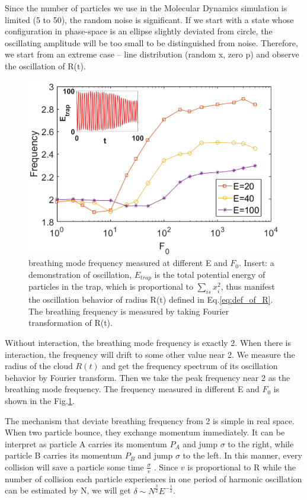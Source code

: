 \documentclass[aps,preprintnumbers,onecolumn,amsmath,amssymb,floatfix,pra]{revtex4-1}
\begin{document}
Since the number of particles we use in the Molecular Dynamics simulation is limited (5 to 50), the
random noise is significant. If we start with a state whose configuration in phase-space is an
ellipse slightly deviated from circle, the oscillating amplitude will be too small to be
distinguished from noise. Therefore, we start from an extreme case -- line distribution (random x,
zero p) and observe the oscillation of R(t).
\begin{figure}[h]
\center
\includegraphics[scale=0.32]{ZhiyuPictures/freq_scanF_differentE_log_2_with_oscillation_demo.png}
\caption{breathing mode frequency measured at different E and $F_0$. Insert: a demonstration of oscillation, $E_{trap}$ is the total potential energy of particles in the trap, which is proportional to $\sum_{is}{x_i^2}$, thus manifest the oscillation behavior of radius R(t) defined in Eq.\ref{eq:def_of_R}. The breathing frequency is measured by taking Fourier transformation of R(t).}
\label{fig:Breathingfrequency1}
\end{figure}

Without interaction, the breathing mode frequency is exactly 2. When there is interaction, the
frequency will drift to some other value near 2. We measure the radius of the cloud $R(t)$ and get
the frequency spectrum of its oscillation behavior by Fourier transform. Then we take the peak
frequency near 2 as the breathing mode frequency. The frequency measured in different E and $F_0$ is
shown in the Fig.\ref{fig:Breathingfrequency1}.

The mechanism that deviate breathing frequency from 2 is simple in real space. When two particle
bounce, they exchange momentum immediately. It can be interpret as particle A carries its momentum
$P_A$ and jump $\sigma$ to the right, while particle B carries its momentum $P_B$ and jump $\sigma$
to the left. In this manner, every collision will save a particle some time $\frac{\sigma}{v}$
. Since $v$ is proportional to R while the number of collision each particle experiences in one
period of harmonic oscillation can be estimated by N, we will get $\delta\sim
N^{\frac{3}{2}}E^{-\frac{1}{2}}$.
\end{document}

